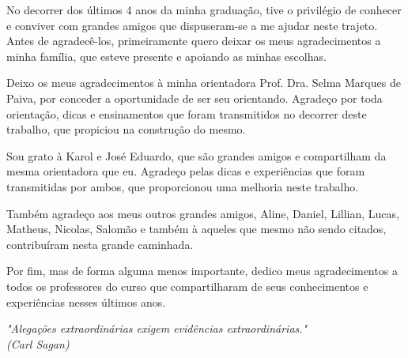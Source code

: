 \documentclass[
	12pt,				%
	openright,			%
    twoside,			%
	a4paper,			%
	chapter=TITLE,		%
	english,			%
	french,				%
	spanish,			%
	brazil				%
	]{abntex2}
\numberwithin{lema}{chapter}
\numberwithin{teorema}{chapter}
\numberwithin{definicao}{chapter}
\numberwithin{exemplo}{chapter}
\numberwithin{figure}{chapter}
\begin{document}
\begin{agradecimentos}[AGRADECIMENTOS]
	
No decorrer dos últimos 4 anos da minha graduação, tive o privilégio de conhecer e conviver com grandes amigos que dispuseram-se a me ajudar neste trajeto. Antes de agradecê-los, primeiramente quero deixar os meus agradecimentos a minha família, que esteve presente e apoiando as minhas escolhas.

Deixo os meus agradecimentos à minha orientadora Prof. Dra. Selma Marques de Paiva, por conceder a oportunidade de ser seu orientando. Agradeço por toda orientação, dicas e ensinamentos que foram transmitidos no decorrer deste trabalho, que propiciou na construção do mesmo.

Sou grato à Karol e José Eduardo, que são grandes amigos e compartilham da mesma orientadora que eu. Agradeço pelas dicas e experiências que foram transmitidas por ambos, que proporcionou uma melhoria neste trabalho.

Também agradeço aos meus outros grandes amigos, Aline, Daniel, Lillian, Lucas, Matheus, Nicolas, Salomão e também à aqueles que mesmo não sendo citados, contribuíram nesta grande caminhada.

Por fim, mas de forma alguma menos importante, dedico meus agradecimentos a todos os professores do curso que compartilharam de seus conhecimentos e experiências nesses últimos anos.

\end{agradecimentos}

\begin{epigrafe}
    \vspace*{\fill}
	\begin{flushright}
		\textit{"Alegações extraordinárias exigem evidências extraordinárias." \\
		(Carl Sagan)}
	\end{flushright}
\end{epigrafe}

\end{document}
